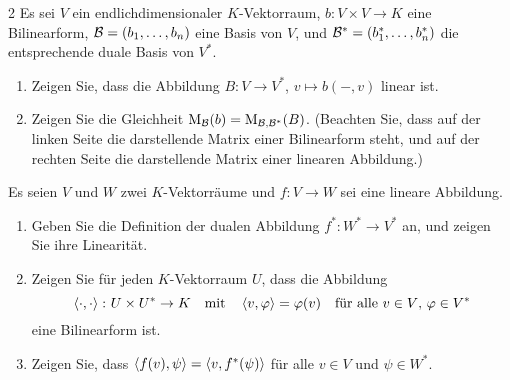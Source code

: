 \begin{question}[subtitle = Matrizen als Bilinearformen und lineare Abbildungen]{2}
  Es sei $V$ ein endlichdimensionaler $K$-Vektorraum, $b \colon V \times V \to K$ eine Bilinearform, $\mathcal{B} = (b_1, \dotsc, b_n)$ eine Basis von $V$, und $\mathcal{B}^* = (b_1^*, \dotsc, b_n^*)$ die entsprechende duale Basis von $V^*$.
  \begin{enumerate}[leftmargin=*]
    \item
      Zeigen Sie, dass die Abbildung $B \colon V \to V^*$, $v \mapsto b(-, v)$ linear ist.
    \item
      Zeigen Sie die Gleichheit $\operatorname{M}_{\mathcal{B}}(b) = \operatorname{M}_{\mathcal{B}, \mathcal{B}^*}(B)$.
      (Beachten Sie, dass auf der linken Seite die darstellende Matrix einer Bilinearform steht, und auf der rechten Seite die darstellende Matrix einer linearen Abbildung.)
  \end{enumerate}
\end{question}







\begin{question}[subtitle = Die duale Abbildung als Adjungiertes]{3}
  Es seien $V$ und $W$ zwei $K$-Vektorräume und $f \colon V \to W$ sei eine lineare Abbildung.
  \begin{enumerate}[leftmargin=*]
    \item
      Geben Sie die Definition der dualen Abbildung $f^* \colon W^* \to V^*$ an, und zeigen Sie ihre Linearität.
    \item
      Zeigen Sie für jeden $K$-Vektorraum $U$, dass die Abbildung
      \[
        \left\langle \cdot, \cdot \right\rangle \colon U \times U^* \to K
        \quad\text{mit}\quad
        \left\langle v, \varphi \right\rangle = \varphi(v)
        \quad\text{für alle $v \in V$, $\varphi \in V^*$}
      \]
      eine Bilinearform ist.
    \item
      Zeigen Sie, dass $\left\langle f(v), \psi \right\rangle = \left\langle v, f^*(\psi) \right\rangle$ für alle $v \in V$ und $\psi \in W^*$.
  \end{enumerate}
\end{question}


